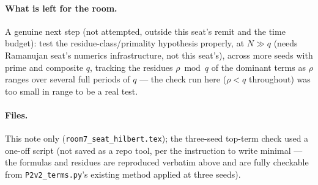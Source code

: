 \documentclass[11pt]{article}
\theoremstyle{remark}\newtheorem{remark}[theorem]{Remark}
\begin{document}
\paragraph{What is left for the room.} A genuine next step (not attempted, outside this seat's remit and the time budget): test
the residue-class/primality hypothesis properly, at $N\gg q$ (needs Ramanujan seat's numerics infrastructure, not this seat's),
across more seeds with prime and composite $q$, tracking the residues $\rho\bmod q$ of the dominant terms as $\rho$ ranges over
several full periods of $q$ — the check run here ($\rho<q$ throughout) was too small in range to be a real test.

\paragraph{Files.} This note only (\texttt{room7\_seat\_hilbert.tex}); the three-seed top-term check used a one-off script
(not saved as a repo tool, per the instruction to write minimal — the formulas and residues are reproduced verbatim above and
are fully checkable from \texttt{P2v2\_terms.py}'s existing method applied at three seeds).
\end{document}
